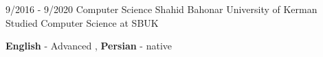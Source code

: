 \documentclass[9pt]{developercv} %
\begin{document}
\vspace{-10 pt}
\begin{entrylist}
	\entry
	{9/2016 - 9/2020}
	{Computer Science }
	{Shahid Bahonar University of Kerman}
	{Studied Computer Science at SBUK}
\end{entrylist}

\vspace{-10 pt}
\vspace{-6pt}

\hspace{26mm} \textbf{English} - Advanced , \textbf{ Persian} - native

\end{document}
